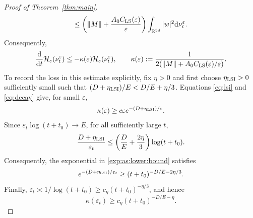 \documentclass[11pt]{article}
\theoremstyle{definition}
\newcommand{\R}{\mathbb R}
\newcommand{\dd}{\mathrm d}
\newcommand{\cH}{\mathcal H}
\newcommand{\eps}{\varepsilon}
\begin{document}
\begin{proof}[Proof of Theorem~\ref{thm:main}]
\[ \leq\left(\|M\|+\frac{A_0C_{\rm LS}(\eps)}{\eps}\right)
       \int_{\R^{3d}}|w|^2\dd\nu_t^\eps.
\]
Consequently,
\begin{equation}\label{eq:decay}
 \frac{\dd}{\dd t}\cH_\eps(\nu_t^\eps)
 \leq-\kappa(\eps)\cH_\eps(\nu_t^\eps),\qquad
 \kappa(\eps):=\frac{1}{2(\|M\|+A_0C_{\rm LS}(\eps)/\eps)}.
\end{equation}
To record the loss in this estimate explicitly, fix $\eta>0$ and first choose
$\eta_{\rm LSI}>0$ sufficiently small such that
$(D+\eta_{\rm LSI})/E<D/E+\eta/3$. Equations
\eqref{eq:lsi} and \eqref{eq:decay} give, for small $\eps$,
\begin{align}\label{exp:as:lower:bound}
 \kappa(\eps)\geq c\eps e^{-(D+\eta_{\rm LSI})/\eps}.
\end{align}
Since $\eps_t\log(t+t_0)\to E$, for all sufficiently large $t$,
\[
 \frac{D+\eta_{\rm LSI}}{\eps_t}
 \leq\left(\frac DE+\frac{2\eta}{3}\right)\log(t+t_0).
\]
Consequently, the exponential in \eqref{exp:as:lower:bound} satisfies
\[
 e^{-(D+\eta_{\rm LSI})/\eps_t}
 \geq(t+t_0)^{-D/E-2\eta/3}.
\]
Finally,
$\eps_t\asymp1/\log(t+t_0)\geq c_\eta(t+t_0)^{-\eta/3}$, and hence
\begin{equation}\label{eq:kappalower}
 \kappa(\eps_t)\geq c_\eta(t+t_0)^{-D/E-\eta}.
\end{equation}


\end{proof}
\end{document}
